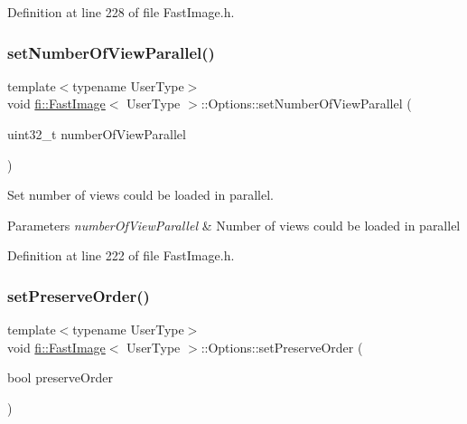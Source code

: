 Definition at line 228 of file Fast\+Image.\+h.

\mbox{\label{classfi_1_1FastImage_1_1Options_aaf52184c01378906412eda1cf8da605b}} 
\subsubsection{\texorpdfstring{set\+Number\+Of\+View\+Parallel()}{setNumberOfViewParallel()}}
{\footnotesize\ttfamily template$<$typename User\+Type$>$ \\
void \hyperlink{classfi_1_1FastImage}{fi\+::\+Fast\+Image}$<$ User\+Type $>$\+::Options\+::set\+Number\+Of\+View\+Parallel (\begin{DoxyParamCaption}\item[{uint32\+\_\+t}]{number\+Of\+View\+Parallel }\end{DoxyParamCaption})\hspace{0.3cm}{\ttfamily [inline]}}



Set number of views could be loaded in parallel. 


\begin{DoxyParams}{Parameters}
{\em number\+Of\+View\+Parallel} & Number of views could be loaded in parallel \\
\hline
\end{DoxyParams}


Definition at line 222 of file Fast\+Image.\+h.

\mbox{\label{classfi_1_1FastImage_1_1Options_a6634270a8e5c86abaa8ed546804df533}} 
\subsubsection{\texorpdfstring{set\+Preserve\+Order()}{setPreserveOrder()}}
{\footnotesize\ttfamily template$<$typename User\+Type$>$ \\
void \hyperlink{classfi_1_1FastImage}{fi\+::\+Fast\+Image}$<$ User\+Type $>$\+::Options\+::set\+Preserve\+Order (\begin{DoxyParamCaption}\item[{bool}]{preserve\+Order }\end{DoxyParamCaption})\hspace{0.3cm}{\ttfamily [inline]}}



